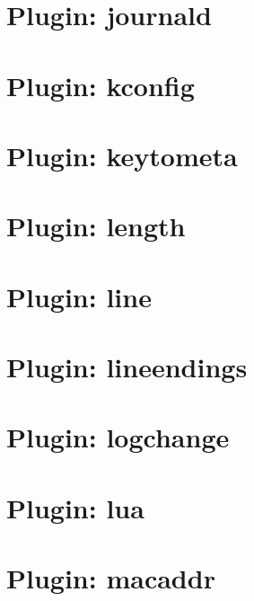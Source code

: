 \let\mypdfximage\pdfximage\def\pdfximage{\immediate\mypdfximage}\documentclass[twoside]{book}
\newcommand{\+}{\discretionary{\mbox{\scriptsize$\hookleftarrow$}}{}{}}
\begin{document}
\chapter{Plugin\+: journald}
\label{md_src_plugins_journald_README}

\chapter{Plugin\+: kconfig}
\label{md_src_plugins_kconfig_README}

\chapter{Plugin\+: keytometa}
\label{md_src_plugins_keytometa_README}

\chapter{Plugin\+: length}
\label{md_src_plugins_length_README}

\chapter{Plugin\+: line}
\label{md_src_plugins_line_README}

\chapter{Plugin\+: lineendings}
\label{md_src_plugins_lineendings_README}

\chapter{Plugin\+: logchange}
\label{md_src_plugins_logchange_README}

\chapter{Plugin\+: lua}
\label{md_src_plugins_lua_README}

\chapter{Plugin\+: macaddr}
\label{md_src_plugins_macaddr_README}

\end{document}
